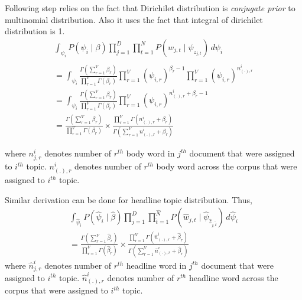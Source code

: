 \documentclass[a4paper]{article}
\begin{document}
Following step relies on the fact that Dirichilet distribution is \textit{conjugate prior} to multinomial distribution. Also it uses the fact that integral of dirichilet distribution is 1.
\begin{multline}
\int_{\psi_{i}} P(\psi_{i} \mid \beta) \prod_{j=1}^{D} \prod_{t=1}^{N} P(w_{j,t} \mid \psi_{z_{j,t}}) \,d\psi_{i}\\\\=
 \int_{\psi_{i}} \frac{\Gamma(\sum_{r=1}^{V} \beta_{r})}{\prod_{r=1}^{V}\Gamma(\beta_{r})} \prod_{r=1}^{V} (\psi_{i,r})^{\beta_{r} -1} \prod_{r=1}^{V} (\psi_{i,r})^{n_{(.),r}^{i}} \\
 = \int_{\psi_{i}} \frac{\Gamma(\sum_{r=1}^{V} \beta_{r})}{\prod_{r=1}^{V}\Gamma(\beta_{r})} \prod_{r=1}^{V} (\psi_{i,r})^{n_{(.),r}^{i} + \beta_{r} -1}\\
 = \frac{\Gamma(\sum_{r=1}^{V} \beta_{r})}{\prod_{r=1}^{V}\Gamma(\beta_{r})} \times \frac{\prod_{r=1}^{V} \Gamma(n_{(.),r}^{i} + \beta_{r} )}{\Gamma(\sum_{r=1}^{V}n_{(.),r}^{i} + \beta_{r} )}
\end{multline}

where $n_{j,r}^{i}$ denotes number of $r^{th}$ body word in $j^{th}$ document that were assigned to $i^{th}$ topic.  $n_{(.),r}^{i}$ denotes number of $r^{th}$ body word across the corpus that were assigned to $i^{th}$ topic.

Similar derivation can be done for headline topic distribution. Thus,
\begin{multline}
\int_{\hat{\psi}_{i}} P(\hat{\psi}_{i} \mid \hat{\beta}) \prod_{j=1}^{D} \prod_{\hat{t}=1}^{\hat{N}} P(\hat{w}_{j,t} \mid \hat{\psi}_{\hat{z}_{j,\hat{t}}}) \,d\hat{\psi}_{i} \\
= \frac{\Gamma(\sum_{r=1}^{V} \hat{\beta}_{r})}{\prod_{r=1}^{V}\Gamma(\hat{\beta}_{r})} \times \frac{\prod_{r=1}^{V} \Gamma(\hat{n}_{(.),r}^{i} + \hat{\beta}_{r} )}{\Gamma(\sum_{r=1}^{V}\hat{n}_{(.),r}^{i} + \hat{\beta}_{r} )}
\end{multline}
where $\hat{n}_{j,r}^{i}$ denotes number of $r^{th}$ headline word in $j^{th}$ document that were assigned to $i^{th}$ topic.  $\hat{n}_{(.),r}^{i}$ denotes number of $r^{th}$ headline word across the corpus that were assigned to $i^{th}$ topic.
\end{document}
